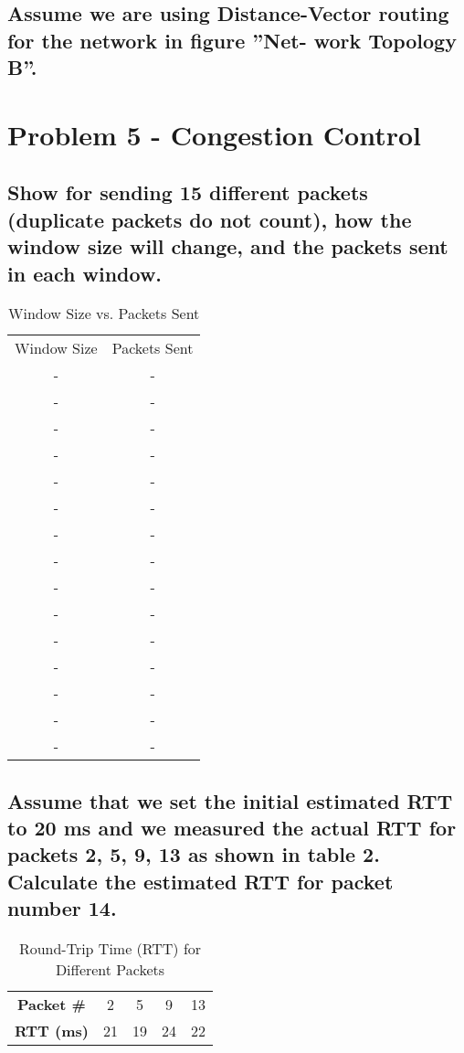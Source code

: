 \documentclass{article}
\begin{document}
\subsection{Assume we are using Distance-Vector routing for the network in figure ”Net-
work Topology B”.}

\section{Problem 5 - Congestion Control}

\subsection{Show for sending 15 different packets (duplicate packets do not count), how the
window size will change, and the packets sent in each window.}

	\begin{table}[h]
		\centering
		\begin{tabular}{cc}
			Window Size & Packets Sent \\
			- & - \\
			- & - \\
			- & - \\
			- & - \\
			- & - \\
			- & - \\
			- & - \\
			- & - \\
			- & - \\
			- & - \\
			- & - \\
			- & - \\
			- & - \\
			- & - \\
			- & - \\
		\end{tabular}
		\caption{Window Size vs. Packets Sent}
		\label{tab:window_packets}
	\end{table}

\subsection{Assume that we set the initial estimated RTT to 20 ms and we measured the
actual RTT for packets 2, 5, 9, 13 as shown in table 2. Calculate the estimated RTT for
packet number 14.}

	\begin{table}[h]
		\centering
		\begin{tabular}{ccccc}
			\textbf{Packet \#} & 2  & 5  & 9  & 13 \\
			\textbf{RTT (ms)}  & 21 & 19 & 24 & 22 \\
		\end{tabular}
		\caption{Round-Trip Time (RTT) for Different Packets}
		\label{tab:rtt_data}
	\end{table}
\end{document}
